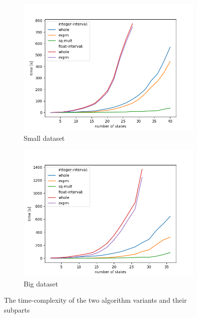 \documentclass[thesis=M,english]{FITthesis}[2012/10/20]
\begin{document}
\begin{itemize}
\begin{figure}
\centering
\begin{subfigure}{.8\textwidth}
  \centering
  \includegraphics[width=1\linewidth]{img/ex2/small.png}
  \caption{Small dataset}
  \label{fig:e2small}
\end{subfigure}
\begin{subfigure}{.8\textwidth}
  \centering
  \includegraphics[width=\linewidth]{img/ex2/big.png}
  \caption{Big dataset}
  \label{fig:e2big}
\end{subfigure}
\caption{ The time-complexity of the two algorithm variants and their subparts }
\label{fig:e2n}
\end{figure}


\end{itemize}
\end{document}
